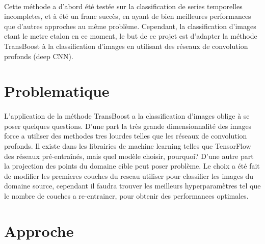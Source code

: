 \documentclass[11 pt]{article}
\begin{document}
\paragraph{}Cette méthode a d’abord été testée sur la classification de series temporelles incompletes, et à été un franc succès, en ayant de bien meilleures performances que d’autres approches au même problème. Cependant, la classification d’images etant le metre etalon en ce moment, le but de ce projet est d’adapter la méthode TransBoost à la classification d’images en utilisant des réseaux de convolution profonds (deep CNN).


\section{Problematique}
\paragraph{}L’application de la méthode TransBoost a la classification d’images oblige à se poser quelques questions. D’une part la très grande dimensionnalité des images force a utiliser des methodes tres lourdes telles que les réseaux de convolution profonds. Il existe dans les librairies de machine learning telles que TensorFlow des réseaux pré-entraînés, mais quel modèle choisir, pourquoi? D’une autre part la projection des points du domaine cible peut poser problème. Le choix a été fait de modifier les premieres couches du reseau utiliser pour classifier les images du domaine source, cependant il faudra trouver les meilleurs hyperparamètres tel que  le nombre de couches a re-entrainer, pour obtenir des performances optimales.

\section{Approche}
\end{document}
